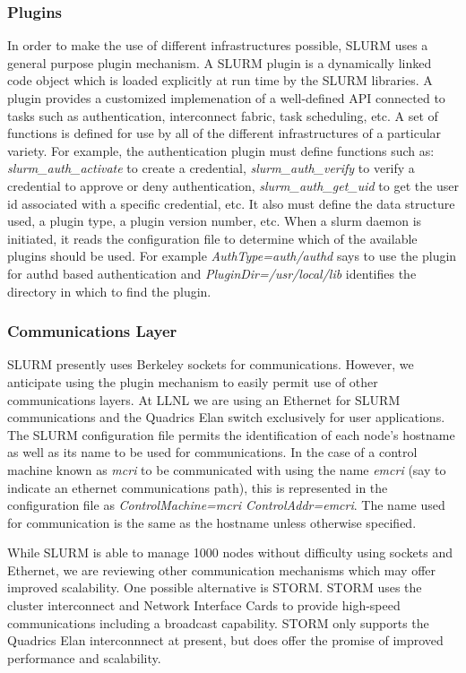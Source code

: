 \documentclass{article}
\begin{document}
\subsubsection{Plugins}

In order to make the use of different infrastructures possible, 
SLURM uses a general purpose plugin mechanism. 
A SLURM plugin is a dynamically linked code object which is 
loaded explicitly at run time by the SLURM libraries. 
A plugin provides a customized implemenation of a well-defined
API connected to tasks such as authentication, interconnect fabric, 
task scheduling, etc.
A set of functions is defined for use by all of the different 
infrastructures of a particular variety. 
For example, the authentication plugin must define functions 
such as: 
{\em slurm\_auth\_activate} to create a credential,
{\em slurm\_auth\_verify} to verify a credential to 
approve or deny authentication, 
{\em slurm\_auth\_get\_uid} to get the user id associated with 
a specific credential, etc.
It also must define the data structure used, a plugin type, 
a plugin version number, etc. 
When a slurm daemon is initiated, it reads the configuration 
file to determine which of the available plugins should be used. 
For example {\em AuthType=auth/authd} says to use the plugin for 
authd based authentication and {\em PluginDir=/usr/local/lib} 
identifies the directory in which to find the plugin.

\subsubsection{Communications Layer}

SLURM presently uses Berkeley sockets for communications. 
However, we anticipate using the plugin mechanism to easily 
permit use of other communications layers. 
At LLNL we are using an Ethernet for SLURM communications and 
the Quadrics Elan switch exclusively for user applications. 
The SLURM configuration file permits the identification of each 
node's hostname as well as its name to be used for communications. 
In the case of a control machine known as {\em mcri} to be 
communicated with using the name {\em emcri} (say to indicate 
an ethernet communications path), this is represented in the 
configuration file as {\em ControlMachine=mcri ControlAddr=emcri}.
The name used for communication is the same as the hostname unless 
otherwise specified.

While SLURM is able to manage 1000 nodes without difficulty using 
sockets and Ethernet, we are reviewing other communication 
mechanisms which may offer improved scalability. 
One possible alternative is STORM\cite{STORM2001}. 
STORM uses the cluster interconnect and Network Interface Cards to 
provide high-speed communications including a broadcast capability. 
STORM only supports the Quadrics Elan interconnnect at present, 
but does offer the promise of improved performance and scalability. 
\end{document}

